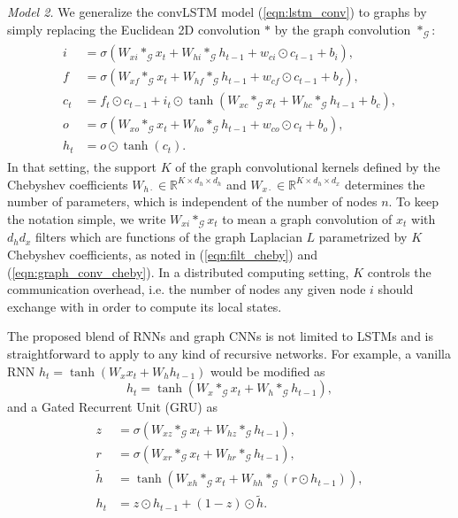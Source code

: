 \documentclass{article} %
\newcommand{\R}{\mathbb{R}}
\newcommand{\G}{\mathcal{G}}
\newcommand{\eqnref}[1]{(\ref{eqn:#1})}
\begin{document}
{\it Model 2.} We generalize the convLSTM model \eqnref{lstm_conv} to graphs by simply 
replacing the Euclidean 2D convolution $\ast$ by the graph convolution
$\ast_\G$:
\begin{align} \label{eqn:lstm_graph_v2}
\begin{split}
	i &= \sigma(W_{xi} \ast_\G x_t + W_{hi} \ast_\G h_{t-1} +
	            w_{ci} \odot c_{t-1} + b_i), \\
	f &= \sigma(W_{xf} \ast_\G x_t + W_{hf} \ast_\G h_{t-1} +
	            w_{cf} \odot c_{t-1} + b_f), \\
	c_t &= f_t \odot c_{t-1} + i_t \odot
	       \tanh(W_{xc} \ast_\G x_t + W_{hc} \ast_\G h_{t-1} + b_c), \\
	o &= \sigma(W_{xo} \ast_\G x_t + W_{ho} \ast_\G h_{t-1} +
	            w_{co} \odot c_t + b_o), \\
	h_t &= o \odot \tanh(c_t).
\end{split}
\end{align}
In that setting, the support $K$ of the graph convolutional kernels defined by
the Chebyshev coefficients $W_{h\cdot} \in \R^{K \times d_h \times d_h}$ and
$W_{x\cdot} \in \R^{K \times d_h \times d_x}$ determines the number of
parameters, which is independent of the number of nodes $n$.  To keep the
notation simple, we write $W_{xi} \ast_\G x_t$ to mean a graph convolution of
$x_t$ with $d_h d_x$ filters which are functions of the graph Laplacian $L$
parametrized by $K$ Chebyshev coefficients, as noted in \eqnref{filt_cheby} and
\eqnref{graph_conv_cheby}. In a distributed computing setting, $K$ controls
the communication overhead, i.e. the number of nodes any given node $i$ should
exchange with in order to compute its local states.

The proposed blend of RNNs and graph CNNs is not limited to LSTMs and is
straightforward to apply to any kind of recursive networks. For example, a
vanilla RNN $h_t = \tanh(W_x x_{t} + W_h h_{t-1})$ would be modified as
\begin{equation} \label{eqn:vrnn_graph}
	h_t = \tanh(W_x \ast_\G x_t + W_h \ast_\G h_{t-1}),
\end{equation}
and a Gated Recurrent Unit (GRU) \citep{gru} as
\begin{align} \label{eqn:gru_graph}
\begin{split}
	z &= \sigma(W_{xz} \ast_\G x_t + W_{hz} \ast_\G h_{t-1}), \\
	r &= \sigma(W_{xr} \ast_\G x_t + W_{hr} \ast_\G h_{t-1}), \\
	\tilde{h} &= \tanh(W_{xh} \ast_\G x_t + W_{hh} \ast_\G (r \odot h_{t-1})), \\
	h_t &= z \odot h_{t-1} + (1-z) \odot \tilde{h}.
\end{split}
\end{align}
\end{document}
